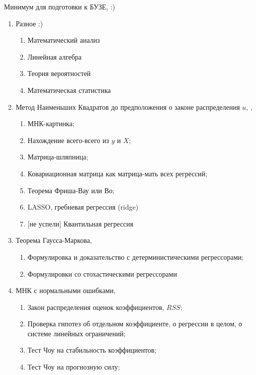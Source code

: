 \documentclass[12pt]{article}
\begin{document}
Минимум для подготовки к БУЗЕ, \cite{creel2018econometrics} :)


\begin{enumerate}

 \item Разное :)
 \begin{enumerate}
   \item Математический анализ
   \item Линейная алгебра
   \item Теория вероятностей
   \item Математическая статистика
 \end{enumerate}

 \item Метод Наименьших Квадратов до предположения о законе распределения $u$,
 \cite{schmidheiny2016guides}, \cite{decrouez2018mmdm}

\begin{enumerate}
 \item МНК-картинка;
 \item Нахождение всего-всего из $y$ и $X$;
 \item Матрица-шляпница;
 \item Ковариационная матрица как матрица-мать всех регрессий;
 \item Теорема Фриша-Вау или Во;
 \item LASSO, гребневая регрессия (ridge)
 \item {[не успели]} Квантильная регрессия
\end{enumerate}

 \item Теорема Гаусса-Маркова,  \cite{schmidheiny2016guides}
 \begin{enumerate}
 \item Формулировка и доказательство с детерминистическими регрессорами;
 \item Формулировки со стохастическими регрессорами
 \end{enumerate}

 \item МНК с нормальными ошибками,  \cite{schmidheiny2016guides}

 \begin{enumerate}
 \item Закон распределения оценок коэффициентов, $RSS$;
 \item Проверка гипотез об отдельном коэффициенте, о регрессии в целом, о системе линейных ограничений;
 \item Тест Чоу на стабильность коэффициентов;
 \item Тест Чоу на прогнозную силу;
 \end{enumerate}


\end{enumerate}
\end{document}
